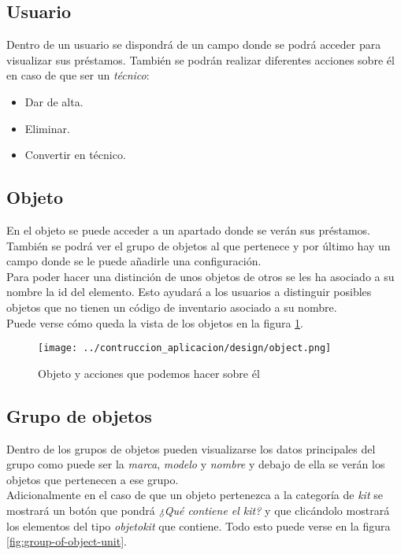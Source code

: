 \subsection{Usuario}
Dentro de un usuario se dispondrá de un campo donde se podrá acceder para visualizar sus préstamos. También se podrán realizar diferentes acciones sobre él en caso de que ser un \textit{técnico}:
\begin{itemize}
    \item Dar de alta.
    \item Eliminar.
    \item Convertir en técnico.
\end{itemize}

\subsection{Objeto}
En el objeto se puede acceder a un apartado donde se verán sus préstamos. También se podrá ver el grupo de objetos al que pertenece y por último hay un campo donde se le puede añadirle una configuración.
\\Para poder hacer una distinción de unos objetos de otros se les ha asociado a su nombre la id del elemento. Esto ayudará a los usuarios a distinguir posibles objetos que no tienen un código de inventario asociado a su nombre.
\\Puede verse cómo queda la vista de los objetos en la figura \ref{fig:object-unit}.

\begin{figure}[ht]
    \centering
    \texttt{[image: ../contruccion\_aplicacion/design/object.png]}
    \caption{Objeto y acciones que podemos hacer sobre él}\label{fig:object-unit}
\end{figure}

\subsection{Grupo de objetos}
Dentro de los grupos de objetos pueden visualizarse los datos principales del grupo como puede ser la \textit{marca}, \textit{modelo} y \textit{nombre} y debajo de ella se verán los objetos que pertenecen a ese grupo.
\\Adicionalmente en el caso de que un objeto pertenezca a la categoría de \textit{kit} se mostrará un botón que pondrá \textit{¿Qué contiene el kit?} y que clicándolo mostrará los elementos del tipo \textit{objetokit} que contiene. Todo esto puede verse en la figura \ref{fig:group-of-object-unit}.

